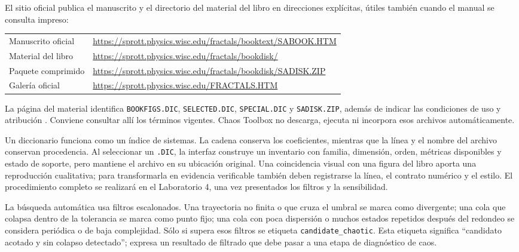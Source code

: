 \documentclass[11pt]{article}
\newcommand{\codigo}[1]{\texttt{#1}}
\begin{document}
El sitio oficial publica el manuscrito y el directorio del material del libro en
direcciones explícitas, útiles también cuando el manual se consulta impreso:
\begin{center}
\small
\begin{tabularx}{0.96\textwidth}{>{\sffamily\color{Teal}}p{}Y}
Manuscrito oficial & \url{https://sprott.physics.wisc.edu/fractals/booktext/SABOOK.HTM}\\
Material del libro & \url{https://sprott.physics.wisc.edu/fractals/bookdisk/}\\
Paquete comprimido & \url{https://sprott.physics.wisc.edu/fractals/bookdisk/SADISK.ZIP}\\
Galería oficial & \url{https://sprott.physics.wisc.edu/FRACTALS.HTM}\\
\end{tabularx}
\end{center}
La página del material identifica \codigo{BOOKFIGS.DIC}, \codigo{SELECTED.DIC},
\codigo{SPECIAL.DIC} y \codigo{SADISK.ZIP}, además de indicar las condiciones de uso y
atribución \cite{sprottbookdisk}. Conviene consultar allí los términos vigentes. Chaos
Toolbox no descarga, ejecuta ni incorpora esos archivos automáticamente.

Un diccionario funciona como un índice de sistemas. La cadena conserva los
coeficientes, mientras que la línea y el nombre del archivo conservan procedencia. Al
seleccionar un \codigo{.DIC}, la interfaz construye un inventario con familia,
dimensión, orden, métricas disponibles y estado de soporte, pero mantiene el archivo en
su ubicación original. Una coincidencia visual con una figura del libro aporta una
reproducción cualitativa; para transformarla en evidencia verificable también deben
registrarse la línea, el contrato numérico y el estilo. El procedimiento completo se
realizará en el Laboratorio 4, una vez presentados los filtros y la sensibilidad.

La búsqueda automática usa filtros escalonados. Una trayectoria no finita o que cruza
el umbral se marca como divergente; una cola que colapsa dentro de la tolerancia se
marca como punto fijo; una cola con poca dispersión o muchos estados repetidos después
del redondeo se considera periódica o de baja complejidad. Sólo si supera esos filtros
se etiqueta \codigo{candidate\_chaotic}. Esta etiqueta significa ``candidato acotado y
sin colapso detectado''; expresa un resultado de filtrado que debe pasar a una etapa de diagnóstico de caos.
\end{document}
